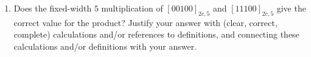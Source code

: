 \documentclass[12pt, oneside]{article}
\begin{document}
\begin{enumerate}
\begin{enumerate}
        \item Does the fixed-width $5$ multiplication of $[00100]_{2c,5}$ and 
        $[11100]_{2c,5}$ give the correct value for the product?
        Justify your answer  
        with (clear, correct, complete) calculations and/or references to definitions, 
        and connecting these
        calculations and/or definitions with
        your answer.
    \end{enumerate}
    
\end{enumerate}
\end{document}
